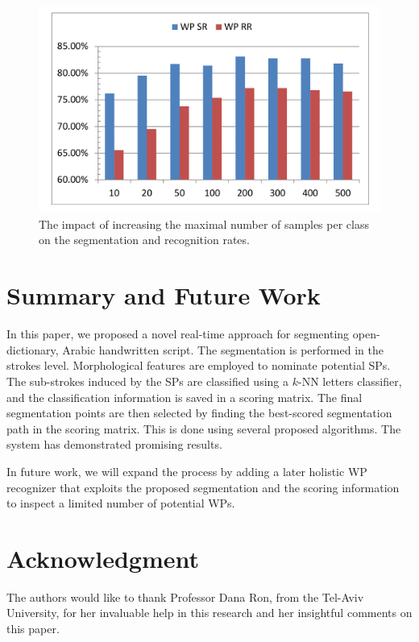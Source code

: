 \documentclass[10pt, conference, compsocconf]{IEEEtran}
\begin{document}
\begin{figure}
\centering
\includegraphics[width=1\columnwidth]{./figures/num_letter_impact}
\caption{The impact of increasing the maximal number of samples per class on the segmentation and recognition rates.}
\label{fig:num_letter_impact}
\vspace{-15pt}
\end{figure}

\section{Summary and Future Work}
In this paper, we proposed a novel real-time approach for segmenting open-dictionary, Arabic handwritten script.
The segmentation is performed in the strokes level. 
Morphological features are employed to nominate potential SPs. 
The sub-strokes induced by the SPs are classified using a $k$-NN letters classifier, and the classification information is saved in a scoring matrix.
The final segmentation points are then selected by finding the best-scored segmentation path in the scoring matrix. 
This is done using several proposed algorithms. 
The system has demonstrated promising results.

In future work, we will expand the process by adding a later holistic WP recognizer that exploits the proposed segmentation and the scoring information to inspect a limited number of potential WPs.

\section*{Acknowledgment}
The authors would like to thank Professor Dana Ron, from the Tel-Aviv University, for her invaluable help in this research and her insightful comments on this paper.\\

\linespread{0.9}



\end{document}
